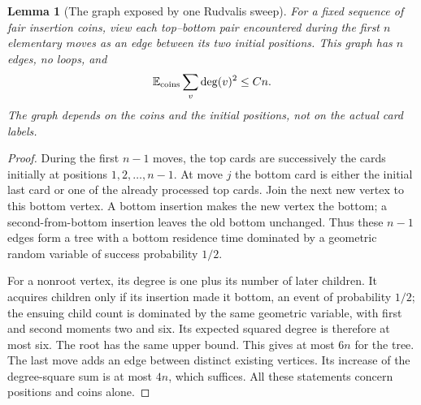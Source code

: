 \documentclass[11pt]{article}
\newtheorem{lemma}[theorem]{Lemma}
\theoremstyle{remark}
\newcommand{\E}{\mathbb E}
\begin{document}
\begin{lemma}[The graph exposed by one Rudvalis sweep]\label{lem:sweepgraph}
For a fixed sequence of fair insertion coins, view each top--bottom pair encountered during the first $n$ elementary moves as an edge between its two initial positions. This graph has $n$ edges, no loops, and
\[
 \E_{\rm coins}\sum_v\deg(v)^2\leq Cn.
\]
The graph depends on the coins and the initial positions, not on the actual card labels.
\end{lemma}
\begin{proof}
During the first $n-1$ moves, the top cards are successively the cards initially at positions $1,2,\ldots,n-1$. At move $j$ the bottom card is either the initial last card or one of the already processed top cards. Join the next new vertex to this bottom vertex. A bottom insertion makes the new vertex the bottom; a second-from-bottom insertion leaves the old bottom unchanged. Thus these $n-1$ edges form a tree with a bottom residence time dominated by a geometric random variable of success probability $1/2$.

For a nonroot vertex, its degree is one plus its number of later children. It acquires children only if its insertion made it bottom, an event of probability $1/2$; the ensuing child count is dominated by the same geometric variable, with first and second moments two and six. Its expected squared degree is therefore at most six. The root has the same upper bound. This gives at most $6n$ for the tree. The last move adds an edge between distinct existing vertices. Its increase of the degree-square sum is at most $4n$, which suffices. All these statements concern positions and coins alone.
\end{proof}
\end{document}
